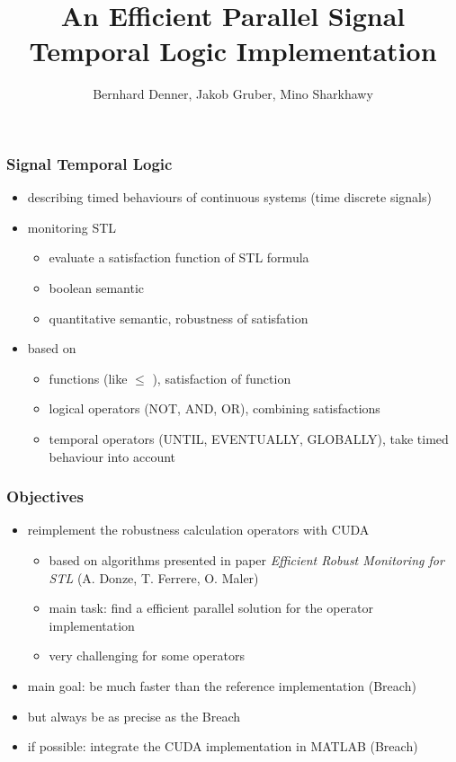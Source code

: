 \documentclass[notes=show]{beamer}
\title{An Efficient Parallel Signal Temporal Logic Implementation}
\author{
	Bernhard Denner,
	Jakob Gruber,
	Mino Sharkhawy
}
\begin{document}
\maketitle

\begin{frame}
\frametitle{Signal Temporal Logic}
\begin{itemize}
    \item describing timed behaviours of continuous systems (time discrete signals)
    \item monitoring STL 
          \begin{itemize}
        	\item evaluate a satisfaction function of STL formula
        	\item boolean semantic
        	\item quantitative semantic, robustness of satisfation
          \end{itemize}
    \item based on
          \begin{itemize}
        	\item functions (like $\leq$ ), satisfaction of function
        	\item logical operators (NOT, AND, OR), combining satisfactions
        	\item temporal operators (UNTIL, EVENTUALLY, GLOBALLY), take timed behaviour into account
          \end{itemize}
\end{itemize}
\end{frame}

\begin{frame}
\frametitle{Objectives}
\begin{itemize}
	\item reimplement the robustness calculation operators with CUDA
	\begin{itemize}
	    \item based on algorithms presented in paper \emph{Efficient Robust Monitoring for STL} (A. Donze, T. Ferrere, O. Maler)
	    \item main task: find a efficient parallel solution for the operator implementation
	    \item very challenging for some operators
    \end{itemize}
	\item main goal: be much faster than the reference implementation (Breach)
	\item but always be as precise as the Breach
	\item if possible: integrate the CUDA implementation in MATLAB (Breach)
\end{itemize}
\end{frame}
\end{document}
